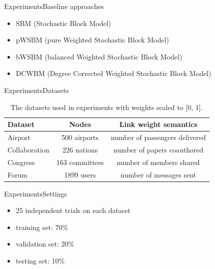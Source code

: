 \documentclass{beamer}
\begin{document}
\begin{frame}{Experiments}{Baseline approaches}
	\begin{itemize}
		\item SBM (Stochastic Block Model)
		\item pWSBM (pure Weighted Stochastic Block Model)
		\item bWSBM (balanced Weighted Stochastic Block Model)
		\item DCWBM (Degree Corrected Weighted Stochastic Block Model)
	\end{itemize}
\end{frame}

\begin{frame}{Experiments}{Datasets}
	\begin{table}[H]\centering
		\caption{The datasets used in experiments with weights scaled to [0, 1].}
		\begin{tabularx}{\textwidth}{|X|c|c|}  \hline
			Dataset & Nodes & Link weight semantics \\ \hline
			Airport & 500 airports & number of passengers delivered \\ \hline
			Collaboration & 226 nations & number of papers coauthored \\ \hline
			Congress & 163 committees  & number of members shared \\ \hline
			Forum  & 1899 users & number of messages sent \\ \hline
		\end{tabularx}
		\label{tab:datasets}
	\end{table}
\end{frame}

\begin{frame}{Experiments}{Settings}
	\begin{itemize}
		\item 25 independent trials on each dataset
		\item training set: 70\%
		\item validation set: 20\%
		\item testing set: 10\%
	\end{itemize}
\end{frame}
\end{document}
